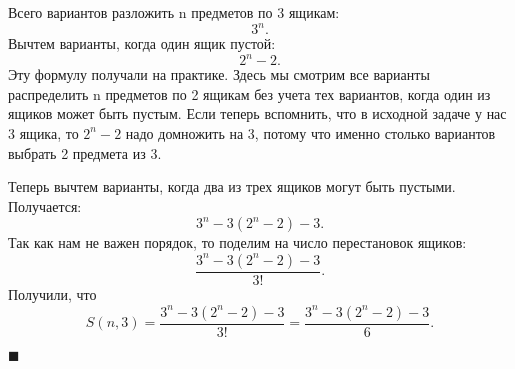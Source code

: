 \documentclass{article}
\begin{document}
\begin{enumerate}
    Всего вариантов разложить n предметов по 3 ящикам:
    \begin{equation}
        3^n.
    \end{equation}
    Вычтем варианты, когда один ящик пустой:
    \begin{equation}
        2^n - 2.
    \end{equation}
    Эту формулу получали на практике. Здесь мы смотрим все варианты распределить n предметов по 2 ящикам без учета тех вариантов, когда один из ящиков может быть пустым. Если теперь вспомнить, что в исходной задаче у нас 3 ящика, то $2^n - 2$ надо домножить на 3, потому что именно столько вариантов выбрать 2 предмета из 3.

    Теперь вычтем варианты, когда два из трех ящиков могут быть пустыми. Получается:
    \begin{equation}
        3^n-3(2^n-2)-3.
    \end{equation}
    Так как нам не важен порядок, то поделим на число перестановок ящиков:
    \begin{equation}
        \frac{3^n-3(2^n-2)-3}{3!}.
    \end{equation}
    Получили, что
    \begin{equation}
        S(n,3)=\frac{3^n-3(2^n-2)-3}{3!} = \frac{3^n-3(2^n-2)-3}{6}.
    \end{equation}
    \begin{flushright}
        $\blacksquare$
    \end{flushright}
    
    
    
    \end{enumerate}
\end{document}
